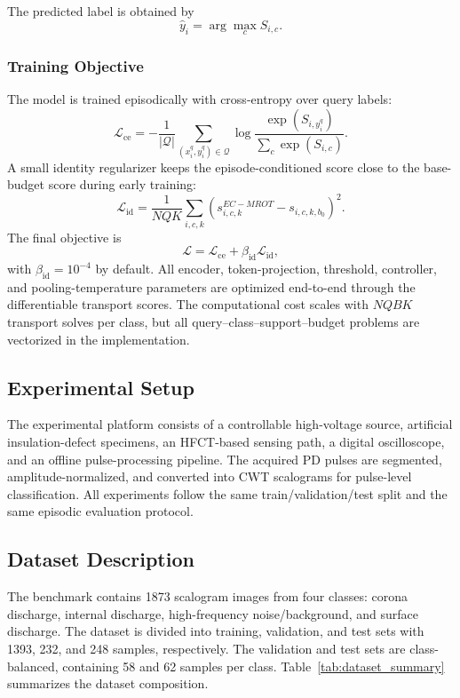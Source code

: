 \documentclass[journal]{IEEEtran}
\newcommand{\method}{EC-MROT}
\newcommand{\Qset}{\mathcal{Q}}
\newcommand{\1}{\mathbf{1}}
\begin{document}
The predicted label is obtained by
\begin{equation}
    \hat{y}_i
    =
    \arg\max_c S_{i,c}.
\end{equation}

\subsubsection{Training Objective}
The model is trained episodically with cross-entropy over query labels:
\begin{equation}
    \mathcal{L}_{\mathrm{ce}}
    =
    -\frac{1}{|\Qset|}
    \sum_{(x_i^q,y_i^q)\in\Qset}
    \log
    \frac{\exp(S_{i,y_i^q})}
    {\sum_c \exp(S_{i,c})}.
\end{equation}
A small identity regularizer keeps the episode-conditioned score close to the base-budget score during early training:
\begin{equation}
    \mathcal{L}_{\mathrm{id}}
    =
    \frac{1}{NQK}
    \sum_{i,c,k}
    \left(
        s_{i,c,k}^{\method}
        -
        s_{i,c,k,b_0}
    \right)^2.
\end{equation}
The final objective is
\begin{equation}
    \mathcal{L}
    =
    \mathcal{L}_{\mathrm{ce}}
    +
    \beta_{\mathrm{id}}\mathcal{L}_{\mathrm{id}},
    \label{eq:ecot_loss}
\end{equation}
with $\beta_{\mathrm{id}}=10^{-4}$ by default. All encoder, token-projection, threshold, controller, and pooling-temperature parameters are optimized end-to-end through the differentiable transport scores. The computational cost scales with $NQBK$ transport solves per class, but all query--class--support--budget problems are vectorized in the implementation.

\subsection{Experimental Setup}
The experimental platform consists of a controllable high-voltage source, artificial insulation-defect specimens, an HFCT-based sensing path, a digital oscilloscope, and an offline pulse-processing pipeline. The acquired PD pulses are segmented, amplitude-normalized, and converted into CWT scalograms for pulse-level classification. All experiments follow the same train/validation/test split and the same episodic evaluation protocol.

\subsection{Dataset Description}
The benchmark contains 1873 scalogram images from four classes: corona discharge, internal discharge, high-frequency noise/background, and surface discharge. The dataset is divided into training, validation, and test sets with 1393, 232, and 248 samples, respectively. The validation and test sets are class-balanced, containing 58 and 62 samples per class. Table~\ref{tab:dataset_summary} summarizes the dataset composition.
\end{document}
